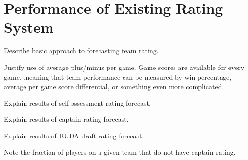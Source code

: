 \section{Performance of Existing Rating System}

Describe basic approach to forecasting team rating.

Justify use of average plus/minus per game. Game scores are available for every game, meaning that team performance can be measured by win percentage, average per game score differential, or something even more complicated.

Explain results of self-assessment rating forecast.

Explain results of captain rating forecast.

Explain results of BUDA draft rating forecast.

Note the fraction of players on a given team that do not have captain rating.